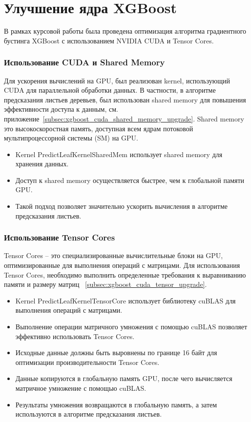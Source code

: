 \documentclass[14pt, a4paper]{../cls/coursework}
\begin{document}
    \section{Улучшение ядра XGBoost}

    В рамках курсовой работы была проведена оптимизация алгоритма градиентного бустинга XGBoost с использованием NVIDIA CUDA и Tensor Cores.

    \subsubsection{Использование CUDA и Shared Memory}

    Для ускорения вычислений на GPU, был реализован kernel, использующий CUDA для параллельной обработки данных.
    В частности, в алгоритме предсказания листьев деревьев, был использован shared memory для повышения эффективности доступа к данным, см. приложение~\ref{subsec:xgboost_cuda_shared_memory_upgrade}.
    Shared memory \textemdash{} это высокоскоростная память, доступная всем ядрам потоковой мультипроцессорной системы (SM) на GPU\@.

    \begin{itemize}
        \item Kernel PredictLeafKernelSharedMem использует shared memory для хранения данных\@.
        \item Доступ к shared memory осуществляется быстрее, чем к глобальной памяти GPU\@.
        \item Такой подход позволяет значительно ускорить вычисления в алгоритме предсказания листьев\@.
    \end{itemize}

    \subsubsection{Использование Tensor Cores}

    Tensor Cores – это специализированные вычислительные блоки на GPU, оптимизированные для выполнения операций с матрицами.
    Для использования Tensor Cores, необходимо выполнить определенные требования к выравниванию памяти и размеру матриц ~\ref{subsec:xgboost_cuda_tensor_upgrade}.
    \begin{itemize}
        \item Kernel PredictLeafKernelTensorCore использует библиотеку cuBLAS для выполнения операций с матрицами.
        \item Выполнение операции матричного умножения с помощью cuBLAS позволяет эффективно использовать Tensor Cores.
        \item Исходные данные должны быть выровнены по границе 16 байт для оптимизации производительности Tensor Cores.
        \item Данные копируются в глобальную память GPU, после чего вычисляется матричное умножение с помощью cuBLAS\@.
        \item Результаты умножения возвращаются в глобальную память, а затем используются в алгоритме предсказания листьев.
    \end{itemize}
\end{document}
